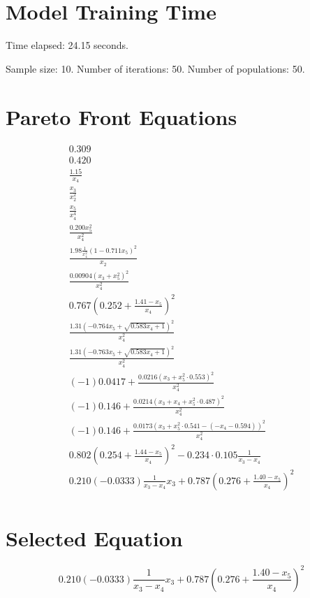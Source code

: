 \documentclass{article}
\begin{document}
\section*{Model Training Time}
Time elapsed: 24.15 seconds.

Sample size: 10.
Number of iterations: 50.
Number of populations: 50.

\section*{Pareto Front Equations}
\begin{align*}
0.309 \\
0.420 \\
\frac{1.15}{x_{4}} \\
\frac{x_{3}}{x_{2}^{2}} \\
\frac{x_{5}}{x_{4}^{4}} \\
\frac{0.200 x_{5}^{2}}{x_{4}^{2}} \\
\frac{1.98 \frac{1}{x_{4}^{2}} \left(1 - 0.711 x_{5}\right)^{2}}{x_{2}} \\
\frac{0.00904 \left(x_{3} + x_{5}^{2}\right)^{2}}{x_{4}^{2}} \\
0.767 \left(0.252 + \frac{1.41 - x_{5}}{x_{4}}\right)^{2} \\
\frac{1.31 \left(- 0.764 x_{5} + \sqrt{0.583 x_{4} + 1}\right)^{2}}{x_{4}^{2}} \\
\frac{1.31 \left(- 0.763 x_{5} + \sqrt{0.583 x_{4} + 1}\right)^{2}}{x_{4}^{2}} \\
\left(-1\right) 0.0417 + \frac{0.0216 \left(x_{3} + x_{5}^{2} \cdot 0.553\right)^{2}}{x_{4}^{2}} \\
\left(-1\right) 0.146 + \frac{0.0214 \left(x_{3} + x_{4} + x_{5}^{2} \cdot 0.487\right)^{2}}{x_{4}^{2}} \\
\left(-1\right) 0.146 + \frac{0.0173 \left(x_{3} + x_{5}^{2} \cdot 0.541 - \left(- x_{4} - 0.594\right)\right)^{2}}{x_{4}^{2}} \\
0.802 \left(0.254 + \frac{1.44 - x_{5}}{x_{4}}\right)^{2} - 0.234 \cdot 0.105 \frac{1}{x_{3} - x_{4}} \\
0.210 \left(-0.0333\right) \frac{1}{x_{3} - x_{4}} x_{3} + 0.787 \left(0.276 + \frac{1.40 - x_{5}}{x_{4}}\right)^{2} \\
\end{align*}

\section*{Selected Equation}
\[ 0.210 \left(-0.0333\right) \frac{1}{x_{3} - x_{4}} x_{3} + 0.787 \left(0.276 + \frac{1.40 - x_{5}}{x_{4}}\right)^{2} \]
\end{document}
